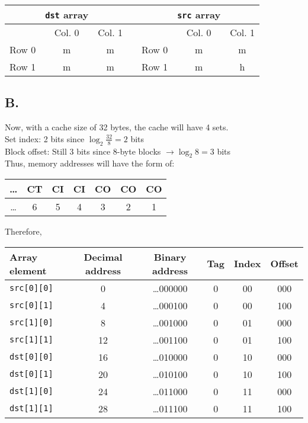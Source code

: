 \documentclass{article}
\begin{document}
\begin{center}
    \begin{tabular}{l c c c l c c}
        & \texttt{dst} array & & \quad & & \texttt{src} array & \\
        \hline
        & Col. 0 & Col. 1 & & & Col. 0 & Col. 1 \\
        \hline
        Row 0 & m & m & & Row 0 & m & m \\
        Row 1 & m & m & & Row 1 & m & h \\
    \end{tabular}
\end{center}

\subsection*{B.}
Now, with a cache size of 32 bytes, the cache will have 4 sets. \\
Set index: 2 bits since $\log_2 \frac{32}{8} = 2$ bits \\
Block offset: Still 3 bits since 8-byte blocks $\rightarrow \log_2 8 = 3$ bits \\
Thus, memory addresses will have the form of: \\
\begin{center}
    \begin{tabular}{|c|c|c|c|c|c|c|}
        \hline
        \ldots & CT & CI & CI & CO & CO & CO \\
        \hline
        \ldots & 6 & 5 & 4 & 3 & 2 & 1 \\
        \hline
    \end{tabular}
\end{center}

\noindent Therefore,
\begin{center}
    \begin{tabular}{|l|c|c|c|c|c|}
        \hline
        Array element & Decimal address & Binary address & Tag & Index & Offset \\
        \hline
        \texttt{src[0][0]} & 0 & \ldots 000000 & 0 & 00 & 000 \\
        \texttt{src[0][1]} & 4 & \ldots 000100 & 0 & 00 & 100 \\
        \texttt{src[1][0]} & 8 & \ldots 001000 & 0 & 01 & 000 \\
        \texttt{src[1][1]} & 12 & \ldots 001100 & 0 & 01 & 100 \\
        \texttt{dst[0][0]} & 16 & \ldots 010000 & 0 & 10 & 000 \\
        \texttt{dst[0][1]} & 20 & \ldots 010100 & 0 & 10 & 100 \\
        \texttt{dst[1][0]} & 24 & \ldots 011000 & 0 & 11 & 000 \\
        \texttt{dst[1][1]} & 28 & \ldots 011100 & 0 & 11 & 100 \\
        \hline
    \end{tabular}
\end{center}
\end{document}

